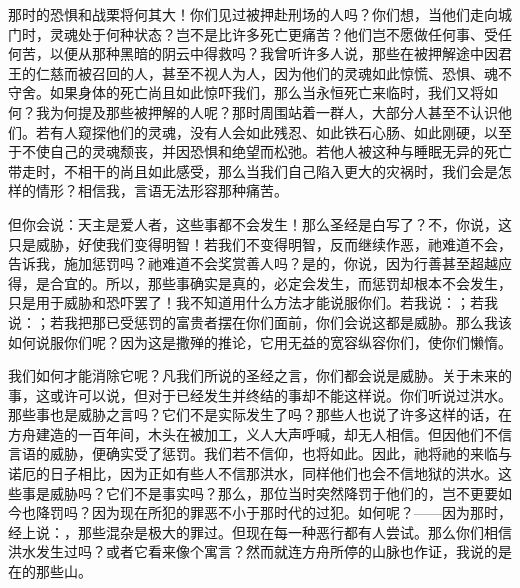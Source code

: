 那时的恐惧和战栗将何其大！你们见过被押赴刑场的人吗？你们想，当他们走向城门时，灵魂处于何种状态？岂不是比许多死亡更痛苦？他们岂不愿做任何事、受任何苦，以便从那种黑暗的阴云中得救吗？我曾听许多人说，那些在被押解途中因君王的仁慈而被召回的人，甚至不视人为人，因为他们的灵魂如此惊慌、恐惧、魂不守舍。如果身体的死亡尚且如此惊吓我们，那么当永恒死亡来临时，我们又将如何？我为何提及那些被押解的人呢？那时周围站着一群人，大部分人甚至不认识他们。若有人窥探他们的灵魂，没有人会如此残忍、如此铁石心肠、如此刚硬，以至于不使自己的灵魂颓丧，并因恐惧和绝望而松弛。若他人被这种与睡眠无异的死亡带走时，不相干的尚且如此感受，那么当我们自己陷入更大的灾祸时，我们会是怎样的情形？相信我，言语无法形容那种痛苦。\par

但你会说：天主是爱人者，这些事都不会发生！那么圣经是白写了？不，你说，这只是威胁，好使我们变得明智！若我们不变得明智，反而继续作恶，祂难道不会，告诉我，施加惩罚吗？祂难道不会奖赏善人吗？是的，你说，因为行善甚至超越应得，是合宜的。所以，那些事确实是真的，必定会发生，而惩罚却根本不会发生，只是用于威胁和恐吓罢了！我不知道用什么方法才能说服你们。若我说：；若我说：；若我把那已受惩罚的富贵者摆在你们面前，你们会说这都是威胁。那么我该如何说服你们呢？因为这是撒殚的推论，它用无益的宽容纵容你们，使你们懒惰。\par

我们如何才能消除它呢？凡我们所说的圣经之言，你们都会说是威胁。关于未来的事，这或许可以说，但对于已经发生并终结的事却不能这样说。你们听说过洪水。那些事也是威胁之言吗？它们不是实际发生了吗？那些人也说了许多这样的话，在方舟建造的一百年间，木头在被加工，义人大声呼喊，却无人相信。但因他们不信言语的威胁，便确实受了惩罚。我们若不信仰，也将如此。因此，祂将祂的来临与诺厄的日子相比，因为正如有些人不信那洪水，同样他们也会不信地狱的洪水。这些事是威胁吗？它们不是事实吗？那么，那位当时突然降罚于他们的，岂不更要如今也降罚吗？因为现在所犯的罪恶不小于那时代的过犯。如何呢？——因为那时，经上说：，那些混杂是极大的罪过。但现在每一种恶行都有人尝试。那么你们相信洪水发生过吗？或者它看来像个寓言？然而就连方舟所停的山脉也作证，我说的是在的那些山。\par

